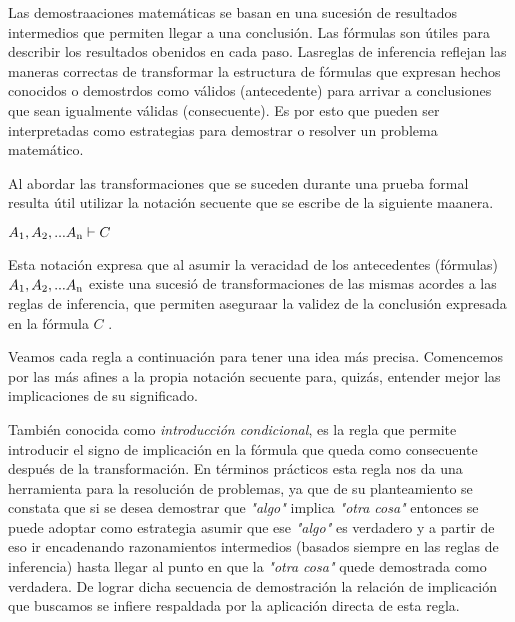 Las demostraaciones matemáticas se basan en una sucesión de resultados intermedios que permiten llegar a una conclusión. Las fórmulas son útiles para describir los resultados obenidos en cada paso. Lasreglas de inferencia reflejan las maneras correctas de transformar la estructura de fórmulas que expresan hechos conocidos o demostrdos como válidos (antecedente) para arrivar a conclusiones que sean igualmente válidas (consecuente). Es por esto que pueden ser interpretadas como estrategias para demostrar o resolver un problema matemático.

Al abordar las transformaciones que se suceden durante una prueba formal resulta útil utilizar la notación secuente que se escribe de la siguiente maanera.

\begin{center}
$A\textsubscript{1}, A\textsubscript{2}, ... A\textsubscript{n} \vdash C$
\end{center}

Esta notación expresa que al asumir la veracidad de los antecedentes (fórmulas) $A\textsubscript{1}, A\textsubscript{2}, ... A\textsubscript{n}$ existe una sucesió de transformaciones de las mismas acordes a las reglas de inferencia, que permiten aseguraar la validez de la conclusión expresada en la fórmula $C$ .

Veamos cada regla a continuación para tener una idea más precisa. Comencemos por las más afines a la propia notación secuente para, quizás, entender mejor las implicaciones de su significado.



También conocida como \textit{introducción condicional}, es la regla que permite introducir el signo de implicación en la fórmula que queda como consecuente después de la transformación. En términos prácticos esta regla nos da una herramienta para la resolución de problemas, ya que de su planteamiento se constata que si se desea demostrar que \textit{"algo"} implica \textit{"otra cosa"} entonces se puede adoptar como estrategia asumir que ese \textit{"algo"} es verdadero y a partir de eso ir encadenando razonamientos intermedios (basados siempre en las reglas de inferencia) hasta llegar al punto en que la \textit{"otra cosa"} quede demostrada como verdadera. De lograr dicha secuencia de demostración la relación de implicación que buscamos se infiere respaldada por la aplicación directa de esta regla.



